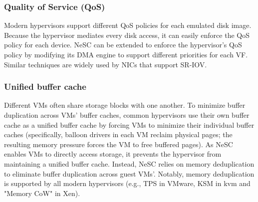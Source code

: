 \subsubsection*{Quality of Service (QoS)}

Modern hypervisors support different QoS policies for each emulated disk image. Because the hypervisor mediates every disk access, it can easily enforce the QoS policy for each device. NeSC can be extended to enforce the hypervisor's QoS policy by modifying its DMA engine to support different priorities for each VF. Similar techniques are widely used by NICs that support SR-IOV.


\subsubsection*{Unified buffer cache}

  Different VMs often share storage blocks with one another.
  To minimize buffer duplication across VMs' buffer caches, common hypervisors use their own buffer cache as a unified buffer cache by forcing VMs to minimize their individual buffer caches (specifically, balloon drivers in each VM reclaim physical pages; the resulting memory pressure forces the VM to free buffered pages). As NeSC enables VMs to directly access storage, it prevents the hypervisor from maintaining a unified buffer cache. Instead, NeSC relies on memory deduplication to eliminate buffer duplication across guest VMs'. Notably, memory deduplication is supported by all modern hypervisors  (e.g., TPS in VMware, KSM in kvm and "Memory CoW" in Xen).  

